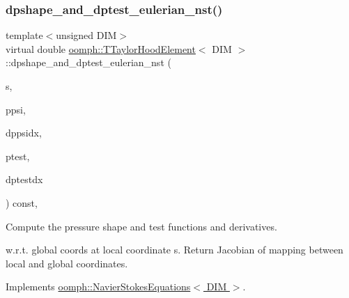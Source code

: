 \subsubsection{\texorpdfstring{dpshape\+\_\+and\+\_\+dptest\+\_\+eulerian\+\_\+nst()}{dpshape\_and\_dptest\_eulerian\_nst()}\hspace{0.1cm}{\footnotesize\ttfamily [1/3]}}
{\footnotesize\ttfamily template$<$unsigned D\+IM$>$ \\
virtual double \hyperlink{classoomph_1_1TTaylorHoodElement}{oomph\+::\+T\+Taylor\+Hood\+Element}$<$ D\+IM $>$\+::dpshape\+\_\+and\+\_\+dptest\+\_\+eulerian\+\_\+nst (\begin{DoxyParamCaption}\item[{const \hyperlink{classoomph_1_1Vector}{Vector}$<$ double $>$ \&}]{s,  }\item[{\hyperlink{classoomph_1_1Shape}{Shape} \&}]{ppsi,  }\item[{\hyperlink{classoomph_1_1DShape}{D\+Shape} \&}]{dppsidx,  }\item[{\hyperlink{classoomph_1_1Shape}{Shape} \&}]{ptest,  }\item[{\hyperlink{classoomph_1_1DShape}{D\+Shape} \&}]{dptestdx }\end{DoxyParamCaption}) const\hspace{0.3cm}{\ttfamily [protected]}, {\ttfamily [virtual]}}



Compute the pressure shape and test functions and derivatives. 

w.\+r.\+t. global coords at local coordinate s. Return Jacobian of mapping between local and global coordinates. 

Implements \hyperlink{classoomph_1_1NavierStokesEquations_a2f3024a4d370ec45ddffacb236bc2bb2}{oomph\+::\+Navier\+Stokes\+Equations$<$ D\+I\+M $>$}.

\mbox{\label{classoomph_1_1TTaylorHoodElement_a24aab07a32be810c3d020072a3f4d84b}} 
